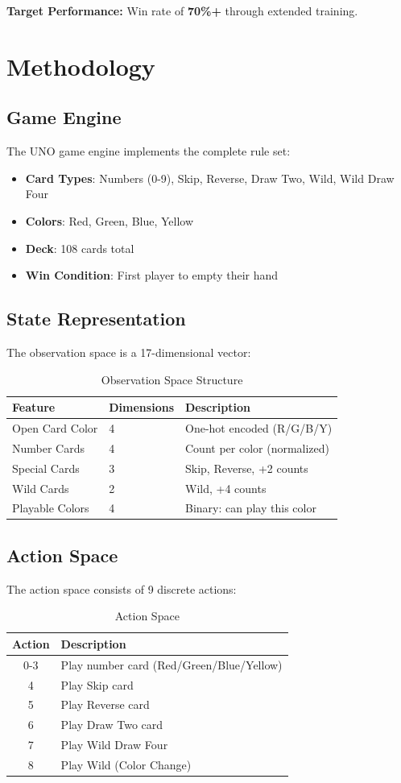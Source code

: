 \documentclass[12pt,a4paper]{article}
\begin{document}
\textbf{Target Performance:} Win rate of \textbf{70\%+} through extended training.
\newpage
\section{Methodology}
\label{sec:methodology}
\subsection{Game Engine}
The UNO game engine implements the complete rule set:
\begin{itemize}
    \item \textbf{Card Types}: Numbers (0-9), Skip, Reverse, Draw Two, Wild, Wild Draw Four
    \item \textbf{Colors}: Red, Green, Blue, Yellow
    \item \textbf{Deck}: 108 cards total
    \item \textbf{Win Condition}: First player to empty their hand
\end{itemize}
\subsection{State Representation}
The observation space is a 17-dimensional vector:
\begin{table}[H]
\centering
\begin{tabular}{lll}
\toprule
\textbf{Feature} & \textbf{Dimensions} & \textbf{Description} \\
\midrule
Open Card Color & 4 & One-hot encoded (R/G/B/Y) \\
Number Cards & 4 & Count per color (normalized) \\
Special Cards & 3 & Skip, Reverse, +2 counts \\
Wild Cards & 2 & Wild, +4 counts \\
Playable Colors & 4 & Binary: can play this color \\
\bottomrule
\end{tabular}
\caption{Observation Space Structure}
\label{tab:obs_space}
\end{table}
\subsection{Action Space}
The action space consists of 9 discrete actions:
\begin{table}[H]
\centering
\begin{tabular}{cl}
\toprule
\textbf{Action} & \textbf{Description} \\
\midrule
0-3 & Play number card (Red/Green/Blue/Yellow) \\
4 & Play Skip card \\
5 & Play Reverse card \\
6 & Play Draw Two card \\
7 & Play Wild Draw Four \\
8 & Play Wild (Color Change) \\
\bottomrule
\end{tabular}
\caption{Action Space}
\label{tab:action_space}
\end{table}
\end{document}
